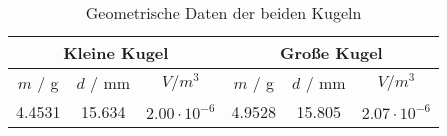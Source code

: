 \begin{table}[!htp]
\centering
\caption{Geometrische Daten der beiden Kugeln}
\label{tab:Kugeln}
\begin{tabular}{c c c c c c}
\toprule
\multicolumn{3}{c}{Kleine Kugel} & \multicolumn{3}{c}{Große Kugel} \\
\midrule
{$m$ / g} & {$d$ / mm} & {$V / m^3$ } & {$m$ / g} & {$d$ / mm} & {$V / m^3$ } \\
4.4531 & 15.634 & $2.00 \cdot 10^{-6}$ & 4.9528 & 15.805 & $2.07 \cdot 10^{-6}$ \\
\bottomrule
\end{tabular}
\end{table}